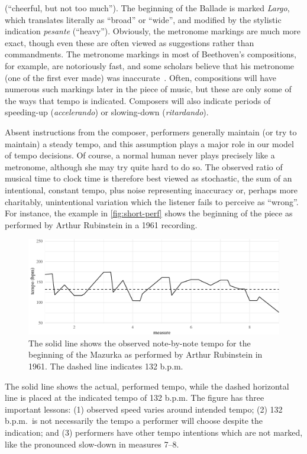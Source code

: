 \documentclass[aoas]{imsart}
\begin{document}
(``cheerful, but not too much''). The beginning of the Ballade is 
marked {\em Largo}, which translates literally as ``broad'' or
``wide'', and modified by the stylistic indication {\em pesante}
(``heavy''). Obviously, the metronome markings are much more exact,
though even these are often viewed as suggestions rather than
commandments. The metronome markings in most of Beethoven's
compositions, for example, are notoriously fast, and some scholars
believe that his metronome (one of the first ever made) was
inaccurate~\citep{ForsenGray2013}. Often, compositions will have numerous such markings later
in the piece of music, but these are only some of the ways that tempo
is indicated. Composers will also indicate periods of speeding-up
(\emph{accelerando}) or
slowing-down (\emph{ritardando}).

Absent instructions from the composer, performers generally maintain
(or try to maintain) a steady tempo, and this assumption plays a major
role in our model of tempo decisions. Of course, a normal human 
never plays precisely like a 
metronome, although she may try quite hard to do so. The observed
ratio of musical time to clock time
is therefore best viewed as stochastic, the sum of an
intentional, constant tempo, plus noise representing inaccuracy
or, perhaps more charitably, unintentional variation which the
listener fails to perceive as ``wrong''. For instance, the example in
\autoref{fig:short-perf} shows the beginning of the piece as performed
by Arthur Rubinstein in a 1961 recording. 
\begin{figure}[t!]
 \centering
 \includegraphics[width=.9\linewidth]{small-rubinstein-1961-1}
 \caption{The solid line shows the observed note-by-note tempo for
   the beginning of the Mazurka as performed by Arthur Rubinstein in
   1961. The dashed line indicates 132 b.p.m.}
 \label{fig:short-perf}
\end{figure}
The solid line shows the
actual, performed tempo, while the dashed horizontal line is placed at
the indicated tempo of 132 b.p.m. The figure has three important
lessons: (1) observed speed varies around intended tempo; (2) 132 b.p.m.\ is
not necessarily the tempo a performer will choose despite the
indication; and (3) performers have other tempo intentions which are
not marked, like the pronounced slow-down in measures 7--8.
\end{document}
